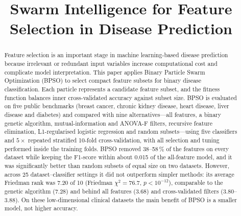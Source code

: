 \documentclass[conference]{IEEEtran}
\begin{document}
\title{Swarm Intelligence for Feature Selection in Disease Prediction}

\author{
\and
{}
\and
{}
\and
{}
\and
{}
}

\maketitle

\begin{abstract}
Feature selection is an important stage in machine learning-based disease
prediction because irrelevant or redundant input variables increase
computational cost and complicate model interpretation. This paper applies
Binary Particle Swarm Optimization (BPSO) to select compact feature subsets
for binary disease classification. Each particle represents a candidate
feature subset, and the fitness function balances inner cross-validated
accuracy against subset size. BPSO is evaluated on five public benchmarks
(breast cancer, chronic kidney disease, heart disease, liver disease and
diabetes) and compared with nine alternatives---all features, a binary genetic
algorithm, mutual-information and ANOVA-F filters, recursive feature
elimination, L1-regularised logistic regression and random subsets---using
five classifiers and $5\times$ repeated stratified 10-fold cross-validation,
with all selection and tuning performed inside the training folds. BPSO
removed 38--58\,\% of the features on every dataset while keeping the F1-score
within about 0.015 of the all-feature model, and it was significantly better
than random subsets of equal size on two datasets. However, across 25
dataset--classifier settings it did not outperform simpler methods: its
average Friedman rank was 7.20 of 10 (Friedman $\chi^2=76.7$, $p<10^{-12}$),
comparable to the genetic algorithm (7.28) and behind all features (3.68) and
cross-validated filters (3.80--3.88). On these low-dimensional clinical
datasets the main benefit of BPSO is a smaller model, not higher accuracy.
\end{abstract}
\end{document}
